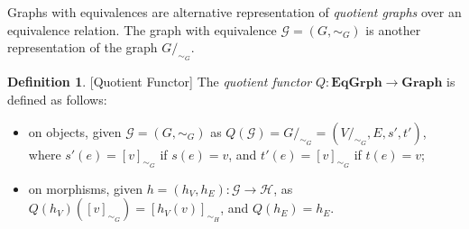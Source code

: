 \documentclass[a4paper, twoside,openright]{report}
\theoremstyle{plain}
\theoremstyle{definition}
\newtheorem{definition}[theorem]{Definition}
\begin{document}



Graphs with equivalences are alternative representation of \emph{quotient graphs} over an equivalence relation. The graph with equivalence $\mathcal{G} = (G, \sim_G)$ is another representation of the graph $G/_{\sim_G}$.

\begin{definition}\label{def:quot_func}[Quotient Functor]
    The \emph{quotient functor} $Q: \mathbf{EqGrph} \rightarrow \mathbf{Graph}$ is defined as follows:
    \begin{itemize}
        \item on objects, given $\mathcal{G}=(G, \sim_{G})$ as $Q(\mathcal{G}) = G/_{\sim_G} = (V/_{\sim_G}, E, s', t')$, where $s'(e) = [v]_{\sim_G}$ if $s(e) = v$, and $t'(e) = [v]_{\sim_G}$ if $t(e) = v$;
        \item on morphisms, given $h = (h_V, h_E): \mathcal{G \rightarrow H}$, as $Q(h_V)([v]_{\sim_G}) = [h_V(v)]_{\sim_H}$, and $Q(h_E) = h_E$.
    \end{itemize}
\end{definition}
\end{document}
